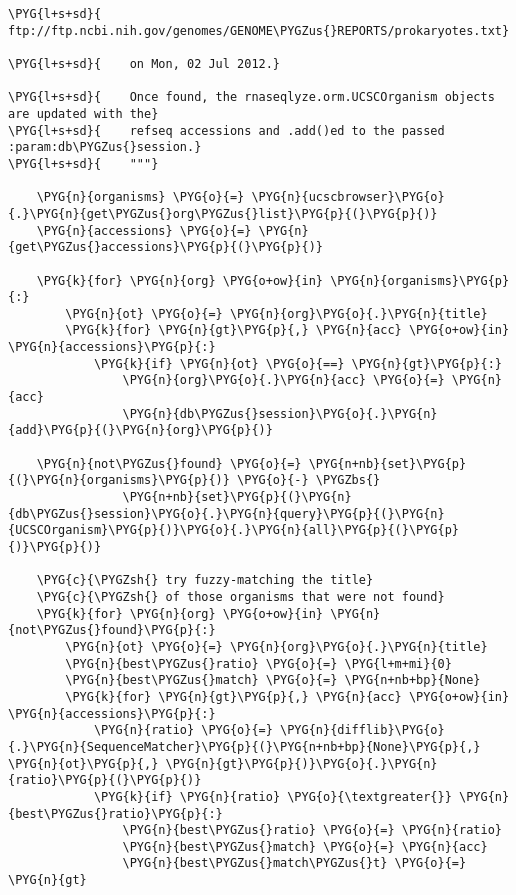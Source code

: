 \begin{Verbatim}[commandchars=\\\{\}]
\PYG{l+s+sd}{        ftp://ftp.ncbi.nih.gov/genomes/GENOME\PYGZus{}REPORTS/prokaryotes.txt}

\PYG{l+s+sd}{    on Mon, 02 Jul 2012.}

\PYG{l+s+sd}{    Once found, the rnaseqlyze.orm.UCSCOrganism objects are updated with the}
\PYG{l+s+sd}{    refseq accessions and .add()ed to the passed :param:db\PYGZus{}session.}
\PYG{l+s+sd}{    """}

    \PYG{n}{organisms} \PYG{o}{=} \PYG{n}{ucscbrowser}\PYG{o}{.}\PYG{n}{get\PYGZus{}org\PYGZus{}list}\PYG{p}{(}\PYG{p}{)}
    \PYG{n}{accessions} \PYG{o}{=} \PYG{n}{get\PYGZus{}accessions}\PYG{p}{(}\PYG{p}{)}

    \PYG{k}{for} \PYG{n}{org} \PYG{o+ow}{in} \PYG{n}{organisms}\PYG{p}{:}
        \PYG{n}{ot} \PYG{o}{=} \PYG{n}{org}\PYG{o}{.}\PYG{n}{title}
        \PYG{k}{for} \PYG{n}{gt}\PYG{p}{,} \PYG{n}{acc} \PYG{o+ow}{in} \PYG{n}{accessions}\PYG{p}{:}
            \PYG{k}{if} \PYG{n}{ot} \PYG{o}{==} \PYG{n}{gt}\PYG{p}{:}
                \PYG{n}{org}\PYG{o}{.}\PYG{n}{acc} \PYG{o}{=} \PYG{n}{acc}
                \PYG{n}{db\PYGZus{}session}\PYG{o}{.}\PYG{n}{add}\PYG{p}{(}\PYG{n}{org}\PYG{p}{)}

    \PYG{n}{not\PYGZus{}found} \PYG{o}{=} \PYG{n+nb}{set}\PYG{p}{(}\PYG{n}{organisms}\PYG{p}{)} \PYG{o}{-} \PYGZbs{}
                \PYG{n+nb}{set}\PYG{p}{(}\PYG{n}{db\PYGZus{}session}\PYG{o}{.}\PYG{n}{query}\PYG{p}{(}\PYG{n}{UCSCOrganism}\PYG{p}{)}\PYG{o}{.}\PYG{n}{all}\PYG{p}{(}\PYG{p}{)}\PYG{p}{)}

    \PYG{c}{\PYGZsh{} try fuzzy-matching the title}
    \PYG{c}{\PYGZsh{} of those organisms that were not found}
    \PYG{k}{for} \PYG{n}{org} \PYG{o+ow}{in} \PYG{n}{not\PYGZus{}found}\PYG{p}{:}
        \PYG{n}{ot} \PYG{o}{=} \PYG{n}{org}\PYG{o}{.}\PYG{n}{title}
        \PYG{n}{best\PYGZus{}ratio} \PYG{o}{=} \PYG{l+m+mi}{0}
        \PYG{n}{best\PYGZus{}match} \PYG{o}{=} \PYG{n+nb+bp}{None}
        \PYG{k}{for} \PYG{n}{gt}\PYG{p}{,} \PYG{n}{acc} \PYG{o+ow}{in} \PYG{n}{accessions}\PYG{p}{:}
            \PYG{n}{ratio} \PYG{o}{=} \PYG{n}{difflib}\PYG{o}{.}\PYG{n}{SequenceMatcher}\PYG{p}{(}\PYG{n+nb+bp}{None}\PYG{p}{,} \PYG{n}{ot}\PYG{p}{,} \PYG{n}{gt}\PYG{p}{)}\PYG{o}{.}\PYG{n}{ratio}\PYG{p}{(}\PYG{p}{)}
            \PYG{k}{if} \PYG{n}{ratio} \PYG{o}{\textgreater{}} \PYG{n}{best\PYGZus{}ratio}\PYG{p}{:}
                \PYG{n}{best\PYGZus{}ratio} \PYG{o}{=} \PYG{n}{ratio}
                \PYG{n}{best\PYGZus{}match} \PYG{o}{=} \PYG{n}{acc}
                \PYG{n}{best\PYGZus{}match\PYGZus{}t} \PYG{o}{=} \PYG{n}{gt}


\end{Verbatim}
